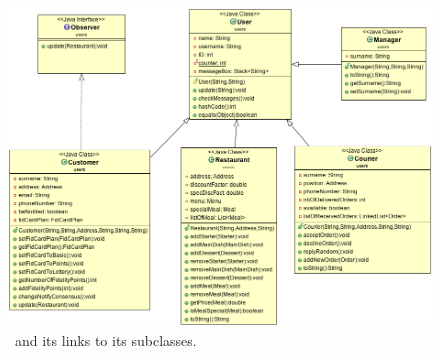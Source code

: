 \begin{figure}
  \begin{center}
    \includegraphics[scale=0.5]{./img/Users.png}
    \end{center}
  \caption{\umld \User~and its links to its subclasses.}
  \label{fig:users_uml}
\end{figure}


